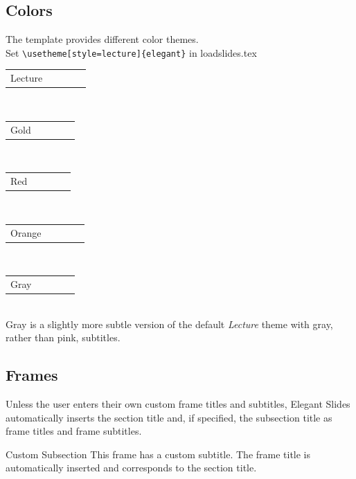 \documentclass[
14pt,notheorems,hyperref={pdfauthor=whatever}
]{beamer}
\begin{document}
\subsection{Colors}
\begin{frame}[fragile]
	\centering
	The template provides different color themes.\\
	Set \verb+\usetheme[style=lecture]{elegant}+ in loadslides.tex\\[0.8cm]
	\newcommand{\colorRow}[1]{
	\begin{tabular}{p{4cm}cccc}
	#1 & \cellcolor{primary}\hspace*{1cm} &\cellcolor{secondary}\hspace*{1cm}&\cellcolor{tertiary}\hspace*{1cm}\\
 	\end{tabular}
 	}
 	\colorRow{Lecture}\\[0.3cm]
 	\colorRow{Gold}\\[0.3cm]
 	\colorRow{Red}\\[0.3cm]
 	\colorRow{Orange}\\[0.3cm]
 	\colorRow{Gray}\\[0.3cm]

 \centering Gray is a slightly more subtle version of the default \textit{Lecture} theme with gray, rather than pink, subtitles. 
\end{frame}

\subsection{Frames}
\begin{frame}
    Unless the user enters their own custom frame titles and subtitles, Elegant Slides automatically inserts the section title and, if specified, the subsection title as frame titles and frame subtitles.
\end{frame}

\begin{frame}{}{Custom Subsection}
    This frame has a custom subtitle. The frame title is automatically inserted and corresponds to the section title.
\end{frame}
\end{document}
